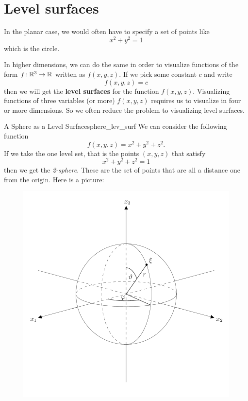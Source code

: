 \section{Level surfaces}
                In the planar case, we would often have to specify a set of points like
                \[
                x^2+y^2=1
                \]
                which is the circle.  
                
                In higher dimensions, we can do the same in order to visualize functions of the form $f\colon \mathbb{R}^3\to \mathbb{R}$ written as $f(x,y,z)$.  If we pick some constant $c$ and write
                \[
                f(x,y,z)=c
                \]
                then we will get the \textbf{level surfaces} for the function $f(x,y,z)$.  Visualizing functions of three variables (or more) $f(x,y,z)$ requires us to visualize in four or more dimensions. So we often reduce the problem to visualizing level surfaces.
                
                \begin{ex}{A Sphere as a Level Surface}{sphere_lev_surf}
                We can consider the following function
                \[
                f(x,y,z)=x^2+y^2+z^2.
                \]
                If we take the one level set, that is the points $(x,y,z)$ that satisfy
                \[
                x^2+y^2+z^2=1
                \]
                then we get the \emph{2-sphere}.  These are the set of points that are all a distance one from the origin.  Here is a picture:
                \begin{figure}[H]
                    \centering
                    \includegraphics[width=.4\textwidth]{Figures_Part_6/sphere.png}
                \end{figure}
                \end{ex}
                
